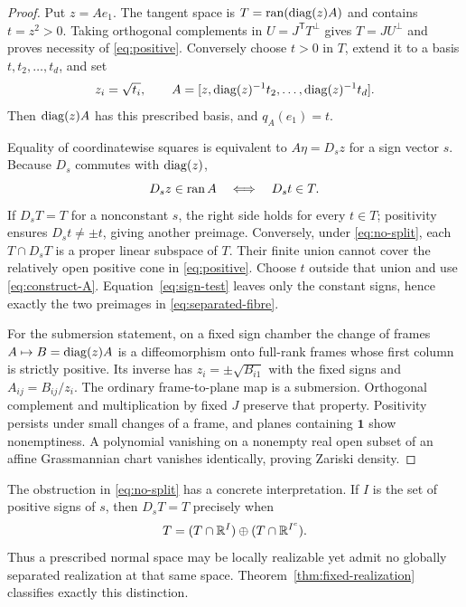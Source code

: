 \begin{proof}
Put $z=Ae_1$. The tangent space is $T=\operatorname{ran}(\operatorname{diag}(z)A)$ and contains $t=z^2>0$. Taking orthogonal complements in $U=J^{\mathsf T}T^\perp$ gives $T=JU^\perp$ and proves necessity of \eqref{eq:positive}. Conversely choose $t>0$ in $T$, extend it to a basis $t,t_2,\ldots,t_d$, and set
\begin{equation}\label{eq:construct-A}
 z_i=\sqrt{t_i},\qquad
 A=[z,\operatorname{diag}(z)^{-1}t_2,\ldots,\operatorname{diag}(z)^{-1}t_d].
\end{equation}
Then $\operatorname{diag}(z)A$ has this prescribed basis, and $q_A(e_1)=t$.

Equality of coordinatewise squares is equivalent to $A\eta=D_sz$ for a sign vector $s$. Because $D_s$ commutes with $\operatorname{diag}(z)$,
\begin{equation}\label{eq:sign-test}
 D_sz\in\operatorname{ran} A\quad\Longleftrightarrow\quad D_st\in T.
\end{equation}
If $D_sT=T$ for a nonconstant $s$, the right side holds for every $t\in T$; positivity ensures $D_st\ne\pm t$, giving another preimage. Conversely, under \eqref{eq:no-split}, each $T\cap D_sT$ is a proper linear subspace of $T$. Their finite union cannot cover the relatively open positive cone in \eqref{eq:positive}. Choose $t$ outside that union and use \eqref{eq:construct-A}. Equation~\eqref{eq:sign-test} leaves only the constant signs, hence exactly the two preimages in \eqref{eq:separated-fibre}.

For the submersion statement, on a fixed sign chamber the change of frames $A\mapsto B=\operatorname{diag}(z)A$ is a diffeomorphism onto full-rank frames whose first column is strictly positive. Its inverse has $z_i=\pm\sqrt{B_{i1}}$ with the fixed signs and $A_{ij}=B_{ij}/z_i$. The ordinary frame-to-plane map is a submersion. Orthogonal complement and multiplication by fixed $J$ preserve that property. Positivity persists under small changes of a frame, and planes containing $\mathbf1$ show nonemptiness. A polynomial vanishing on a nonempty real open subset of an affine Grassmannian chart vanishes identically, proving Zariski density.
\end{proof}
The obstruction in \eqref{eq:no-split} has a concrete interpretation. If $I$ is the set of positive signs of $s$, then $D_sT=T$ precisely when
\[
 T=(T\cap\mathbb R^I)\oplus(T\cap\mathbb R^{I^c}).
\]
Thus a prescribed normal space may be locally realizable yet admit no globally separated realization at that same space. Theorem~\ref{thm:fixed-realization} classifies exactly this distinction.

